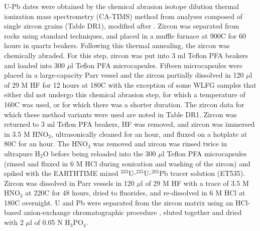 \documentclass[11pt,letterpaper]{article}
\begin{document}
U-Pb dates were obtained by the chemical abrasion isotope dilution thermal ionization mass spectrometry (CA-TIMS) method from analyses composed of single zircon grains (Table DR1), modified after \cite{Mattinson2005a}. Zircon was separated from rocks using standard techniques, and placed in a muffle furnace at 900\textdegree C for 60 hours in quartz beakers. Following this thermal annealing, the zircon was chemically abraded. For this step, zircon was put into 3 ml Teflon PFA beakers and loaded into 300 $\mu$l Teflon PFA microcapsules. Fifteen microcapsules were placed in a large-capacity Parr vessel and the zircon partially dissolved in 120 $\mu$l of 29 M HF for 12 hours at 180\textdegree C with the exception of some WLFG samples that either did not undergo this chemical abrasion step, for which a temperature of 160\textdegree C was used, or for which there was a shorter duration. The zircon data for which these method variants were used are noted in Table DR1. Zircon was returned to 3 ml Teflon PFA beakers, HF was removed, and zircon was immersed in 3.5 M HNO$_\mathrm{3}$, ultrasonically cleaned for an hour, and fluxed on a hotplate at 80\textdegree C for an hour. The HNO$_\mathrm{3}$ was removed and zircon was rinsed twice in ultrapure H$_\mathrm{2}$O before being reloaded into the 300 $\mu$l Teflon PFA microcapsules (rinsed and fluxed in 6 M HCl during sonication and washing of the zircon) and spiked with the EARTHTIME mixed $^{233}$U-$^{235}$U-$^{205}$Pb tracer solution (ET535). Zircon was dissolved in Parr vessels in 120 $\mu$l of 29 M HF with a trace of 3.5 M HNO$_\mathrm{3}$ at 220\textdegree C for 48 hours, dried to fluorides, and re-dissolved in 6 M HCl at 180\textdegree C overnight. U and Pb were separated from the zircon matrix using an HCl-based anion-exchange chromatographic procedure \citep{Krogh1973a}, eluted together and dried with 2 $\mu$l of 0.05 N H$_\mathrm{3}$PO$_\mathrm{4}$.
\end{document}
